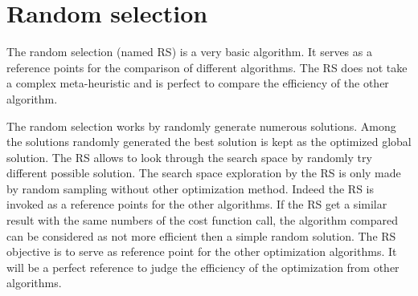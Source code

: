 

\section{Random selection }

The random selection (named RS) is a very basic algorithm. It serves as a reference points for the comparison of different algorithms. The RS does not take a complex meta-heuristic and is perfect to compare the efficiency of the other algorithm.

The random selection works by randomly generate numerous solutions. Among the solutions randomly generated the best solution is kept as the optimized global solution. The RS allows to look through the search space by randomly try different possible solution. The search space exploration by the RS is only made by random sampling without other optimization method. 
Indeed the RS is invoked as a reference points for the other algorithms. If the RS get a similar result with the same numbers of the cost function call, the algorithm compared can be considered as not more efficient then a simple random solution. 
The RS objective is to serve as  reference point for the other optimization algorithms. It will be a perfect reference to judge the efficiency of the optimization from other algorithms.  
  
%
%

